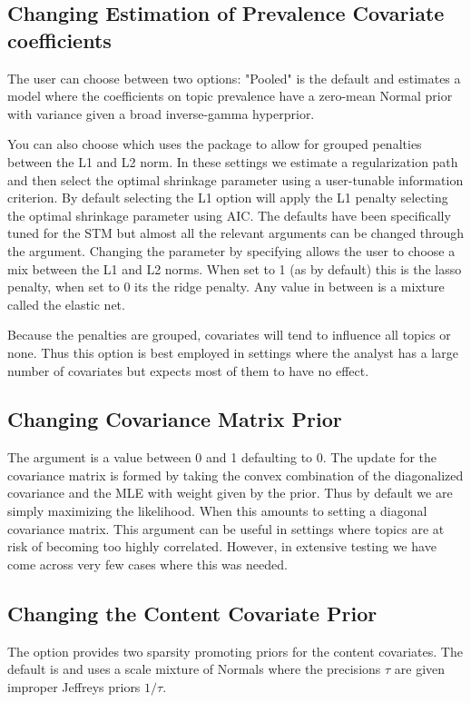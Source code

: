 \documentclass[nojss]{jss}
\begin{document}
\subsection{Changing Estimation of Prevalence Covariate coefficients}

The user can choose between two options: "Pooled" is the default and estimates a model where the coefficients on topic prevalence have a zero-mean Normal prior with variance given a broad
 inverse-gamma hyperprior.

You can also choose  which uses the  package \citep{friedman2010regularization} to allow for grouped penalties between the L1 and L2 norm. In these settings we estimate a regularization path and then select the optimal shrinkage parameter using a user-tunable information criterion. By default selecting the L1 option will apply the L1 penalty selecting the optimal shrinkage parameter using AIC. The defaults have been specifically tuned for the STM but almost all the relevant arguments can be changed through the  argument. Changing the  parameter by specifying  allows the user to choose a mix between the L1 and L2 norms. When set to 1 (as by default) this is the lasso penalty, when set to 0 its the ridge penalty. Any value in between is a mixture called the elastic net.

Because the penalties are grouped, covariates will tend to influence all topics or none.  Thus this option is best employed in settings where the analyst has a large number of covariates but expects most of them to have no effect.

\subsection{Changing Covariance Matrix Prior}
The  argument is a value between 0 and 1 defaulting to 0.  The update for the covariance matrix is formed by taking the convex combination of the diagonalized covariance and the MLE with weight given by the prior.  Thus by default we are simply maximizing the likelihood.  When  this amounts to setting a diagonal covariance matrix.  This argument can be useful in settings where topics are at risk of becoming too highly correlated.  However, in extensive testing we have come across very few cases where this was needed.

\subsection{Changing the Content Covariate Prior}
The  option provides two sparsity promoting priors for the content covariates.  The default is  and uses a scale mixture of Normals where the precisions $\tau$ are given improper Jeffreys priors $1/\tau$.
\end{document}
